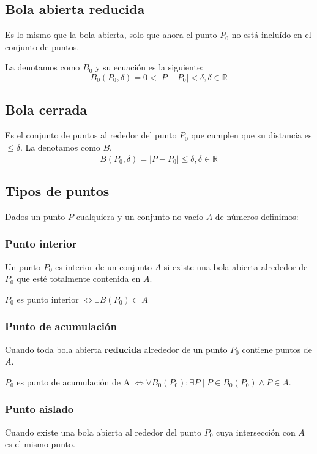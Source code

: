 \documentclass[12pt]{article}
\begin{document}
\subsection{Bola abierta reducida}

Es lo mismo que la bola abierta, solo que ahora el punto $ P_{0} $ no está incluído en el conjunto de puntos.

La denotamos como $ B_{0} $ y su ecuación es la siguiente:
\[
	B_{0}(P_{0}, \delta) = 0 < \left|P - P_{0}\right| < \delta, \delta \in \mathbb{R}^{}
\]

\subsection{Bola cerrada}
Es el conjunto de puntos al rededor del punto $ P_{0} $ que cumplen que su distancia es $ \leq \delta $. La denotamos como $ \overline{B} $.
\[
	\overline{B}(P_{0}, \delta) = \left|P - P_{0}\right| \leq \delta, \delta \in \mathbb{R}^{}
\]

\subsection{Tipos de puntos}
Dados un punto $ P $ cualquiera y un conjunto no vacío $ A $ de números definimos:

\subsubsection{Punto interior}
Un punto $ P_{0} $ es interior de un conjunto $ A $ si existe una bola abierta alrededor de $ P_{0} $ que esté totalmente contenida en $ A $.

$ P_{0} $ es punto interior $ \iff \exists B(P_{0}) \subset A $

\subsubsection{Punto de acumulación}
Cuando toda bola abierta \textbf{reducida} alrededor de un punto $ P_{0} $ contiene puntos de $ A $.

$ P_{0} $ es punto de acumulación de A $ \iff \forall B_{0}(P_{0}): \exists P \mid P \in B_{0}(P_{0}) \land P \in A $.

\subsubsection{Punto aislado}
Cuando existe una bola abierta al rededor del punto $ P_{0} $ cuya intersección con $ A $ es el mismo punto.
\end{document}
